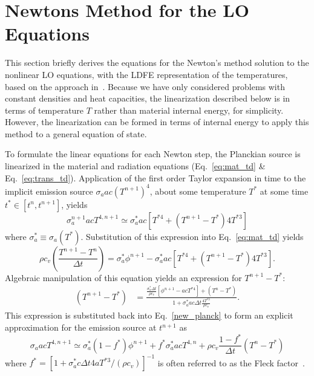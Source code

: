 \section{Newtons Method for the LO Equations}
\label{app:lo_newton}

This section briefly derives the equations for the Newton's method solution to the nonlinear LO equations, with the LDFE representation of the temperatures, based on the approach in~\cite{morel_ldtrt}.
Because we have only considered problems with constant densities and heat capacities, the
linearization described below is in terms of temperature $T$ rather than material internal
energy, for simplicity. However, the linearization can be formed in terms of internal energy
to apply this method to a general equation of state.

To formulate the linear equations for each Newton step, the Planckian source is linearized in the material and radiation equations (Eq.~\eqref{eq:mat_td}
\& Eq.~\eqref{eq:trans_td}). 
Application of the first order Taylor expansion in time to the
implicit emission source $\sigma_a a c (T^{n+1})^4$, about some temperature $T^*$ at some
time $t^*\in[t^{n},t^{n+1}]$, yields
\begin{equation}\label{new_planck}
    \sigma_a^{n+1} a c T^{4,n+1} \simeq \sigma_a^* a c \left[T^{*4} + (T^{n+1} - T^*) 4T^{*3} \right]
\end{equation}
where $\sigma_a^*\equiv\sigma_a(T^*)$.  Substitution of this expression into Eq.~\eqref{eq:mat_td} yields
\begin{equation}
    \rho c_v \left( \frac{T^{n+1} - T^{n}}{\Delta t} \right) = \sigma_a^* \phi^{n+1} -
    \sigma_a^* a c \left[ T^{*4} +  (T^{n+1} - T^*) 4T^{*3} \right].
\end{equation}
Algebraic manipulation of this equation yields an expression for $T^{n+1} - T^{*}$:
\begin{align*}
\left( T^{n+1} - T^* \right) &= \frac{ {\displaystyle \frac{\sigma_a^* \Delta t}{\rho
c_v}}  \left[ \phi^{n+1} -  a c T^{*4} \right] + (T^n - T^*) }{1 +
        \sigma_a^* a c \Delta t\frac{\displaystyle 4
T^{*3}}{\displaystyle \rho c_v } }.
\end{align*}
This expression is substituted back into Eq.~\eqref{new_planck} to form
an explicit approximation for the emission source at $t^{n+1}$ as
\begin{equation}\label{t_next1}
    \sigma_a a c T^{4,n+1} \simeq \sigma_a^* (1 -f^*) \phi^{n+1}
    + f^* \sigma_a^* a c T^{4,n} + \rho c_v\frac{1-f^*}{\Delta t} (T^n - T^*)
\end{equation}
where $f^* = [1 + \sigma_a^* c \Delta t 4 a T^{*3}/(\rho c_v)]^{-1}$ is often referred to
as the Fleck factor~\cite{fnc}. 

